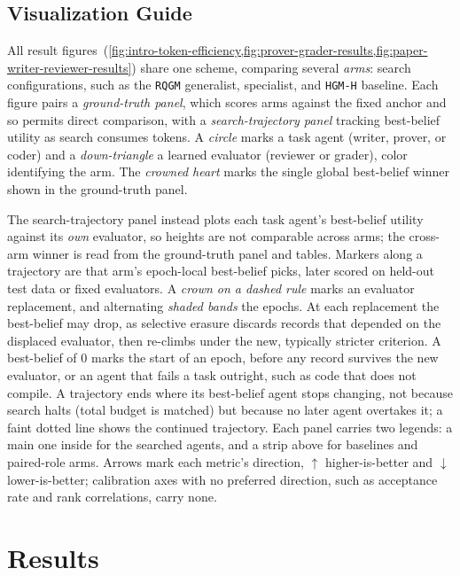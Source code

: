 \documentclass{paper}
\newcommand{\ourmethod}{\texttt{RQGM}\xspace}
\newcommand{\hgmh}{\texttt{HGM-H}\xspace}
\begin{document}
\subsection{Visualization Guide}
\label{exp_design:reading_results_figures}
All result figures~(\cref{fig:intro-token-efficiency,fig:prover-grader-results,fig:paper-writer-reviewer-results}) share one scheme, comparing several \emph{arms}: search configurations, such as the \ourmethod generalist, specialist, and \hgmh baseline. Each figure pairs a \emph{ground-truth panel}, which scores arms against the fixed anchor and so permits direct comparison, with a \emph{search-trajectory panel} tracking best-belief utility as search consumes tokens. A \emph{circle} marks a task agent (writer, prover, or coder) and a \emph{down-triangle} a learned evaluator (reviewer or grader), color identifying the arm. The \emph{crowned heart} marks the single global best-belief winner shown in the ground-truth panel.

The search-trajectory panel instead plots each task agent's best-belief utility against its \emph{own} evaluator, so heights are not comparable across arms; the cross-arm winner is read from the ground-truth panel and tables. Markers along a trajectory are that arm's epoch-local best-belief picks, later scored on held-out test data or fixed evaluators. A \emph{crown on a dashed rule} marks an evaluator replacement, and alternating \emph{shaded bands} the epochs. At each replacement the best-belief may drop, as selective erasure discards records that depended on the displaced evaluator, then re-climbs under the new, typically stricter criterion. A best-belief of $0$ marks the start of an epoch, before any record survives the new evaluator, or an agent that fails a task outright, such as code that does not compile. A trajectory ends where its best-belief agent stops changing, not because search halts (total budget is matched) but because no later agent overtakes it; a faint dotted line shows the continued trajectory. Each panel carries two legends: a main one inside for the searched agents, and a strip above for baselines and paired-role arms. Arrows mark each metric's direction, $\boldsymbol{\uparrow}$ higher-is-better and $\boldsymbol{\downarrow}$ lower-is-better; calibration axes with no preferred direction, such as acceptance rate and rank correlations, carry none.


\section{Results}
\label{sec:experiments}
\end{document}
